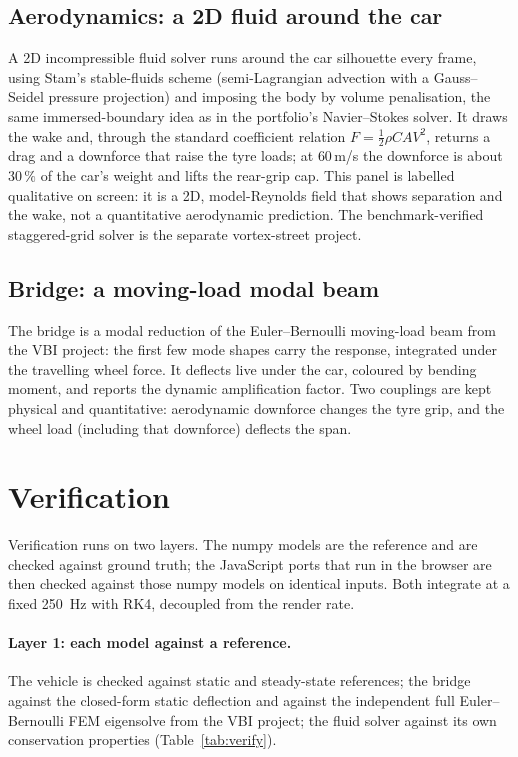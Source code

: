 \documentclass[11pt,a4paper]{article}
\begin{document}
\subsection{Aerodynamics: a 2D fluid around the car}
A 2D incompressible fluid solver runs around the car silhouette every frame, using Stam's
stable-fluids scheme (semi-Lagrangian advection with a Gauss--Seidel pressure projection) and
imposing the body by volume penalisation, the same immersed-boundary idea as in the
portfolio's Navier--Stokes solver. It draws the wake and, through the standard coefficient
relation $F = \tfrac12\rho C A V^2$, returns a drag and a downforce that raise the tyre loads;
at $60\,$m/s the downforce is about $30\,\%$ of the car's weight and lifts the rear-grip cap.
This panel is labelled qualitative on screen: it is a 2D, model-Reynolds field that shows
separation and the wake, not a quantitative aerodynamic prediction. The benchmark-verified
staggered-grid solver is the separate vortex-street project.

\subsection{Bridge: a moving-load modal beam}
The bridge is a modal reduction of the Euler--Bernoulli moving-load beam from the VBI project:
the first few mode shapes carry the response, integrated under the travelling wheel force. It
deflects live under the car, coloured by bending moment, and reports the dynamic amplification
factor. Two couplings are kept physical and quantitative: aerodynamic downforce changes the
tyre grip, and the wheel load (including that downforce) deflects the span.

\section{Verification}
Verification runs on two layers. The numpy
models are the reference and are checked against ground truth; the JavaScript ports that run in
the browser are then checked against those numpy models on identical inputs. Both integrate at
a fixed \SI{250}{\hertz} with RK4, decoupled from the render rate.

\paragraph{Layer 1: each model against a reference.} The vehicle is checked against static and
steady-state references; the bridge against the closed-form static deflection and against the
independent full Euler--Bernoulli FEM eigensolve from the VBI project; the fluid solver against
its own conservation properties (Table~\ref{tab:verify}).
\end{document}

